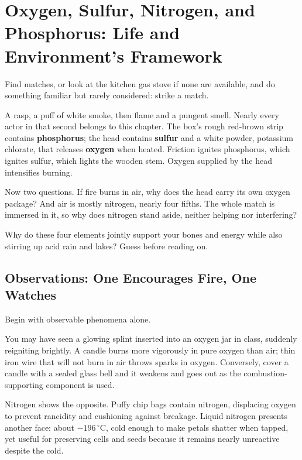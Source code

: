 \chapter{Oxygen, Sulfur, Nitrogen, and Phosphorus: Life and Environment's Framework}

\begin{kaichang}
Find matches, or look at the kitchen gas stove if none are available, and do something familiar but rarely considered: strike a match.

A rasp, a puff of white smoke, then flame and a pungent smell. Nearly every actor in that second belongs to this chapter. The box's rough red-brown strip contains \textbf{phosphorus}; the head contains \textbf{sulfur} and a white powder, potassium chlorate, that releases \textbf{oxygen} when heated. Friction ignites phosphorus, which ignites sulfur, which lights the wooden stem. Oxygen supplied by the head intensifies burning.

Now two questions. If fire burns in air, why does the head carry its own oxygen package? And air is mostly nitrogen, nearly four fifths. The whole match is immersed in it, so why does nitrogen stand aside, neither helping nor interfering?

Why do these four elements jointly support your bones and energy while also stirring up acid rain and lakes? Guess before reading on.
\end{kaichang}

\section{Observations: One Encourages Fire, One Watches}

Begin with observable phenomena alone.

You may have seen a glowing splint inserted into an oxygen jar in class, suddenly reigniting brightly. A candle burns more vigorously in pure oxygen than air; thin iron wire that will not burn in air throws sparks in oxygen. Conversely, cover a candle with a sealed glass bell and it weakens and goes out as the combustion-supporting component is used.

Nitrogen shows the opposite. Puffy chip bags contain nitrogen, displacing oxygen to prevent rancidity and cushioning against breakage. Liquid nitrogen presents another face: about $-196\,^{\circ}\mathrm{C}$, cold enough to make petals shatter when tapped, yet useful for preserving cells and seeds because it remains nearly unreactive despite the cold.

